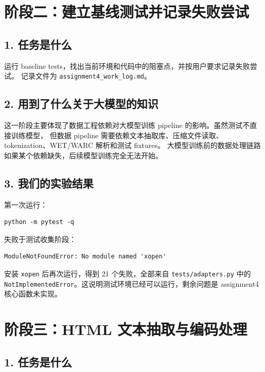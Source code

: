 \documentclass[UTF8,11pt]{ctexart}
\begin{document}
\section{阶段二：建立基线测试并记录失败尝试}

\subsection*{1. 任务是什么}

运行 baseline tests，找出当前环境和代码中的阻塞点，并按用户要求记录失败尝试。
记录文件为 \texttt{assignment4\_work\_log.md}。

\subsection*{2. 用到了什么关于大模型的知识}

这一阶段主要体现了数据工程依赖对大模型训练 pipeline 的影响。虽然测试不直接训练模型，
但数据 pipeline 需要依赖文本抽取库、压缩文件读取、tokenization、WET/WARC 解析和测试 fixtures。
大模型训练前的数据处理链路如果某个依赖缺失，后续模型训练完全无法开始。

\subsection*{3. 我们的实验结果}

第一次运行：

\begin{lstlisting}
python -m pytest -q
\end{lstlisting}

失败于测试收集阶段：

\begin{lstlisting}
ModuleNotFoundError: No module named 'xopen'
\end{lstlisting}

安装 \texttt{xopen} 后再次运行，得到 21 个失败，全部来自 \texttt{tests/adapters.py} 中的
\texttt{NotImplementedError}。这说明测试环境已经可以运行，剩余问题是 assignment4 核心函数未实现。

\section{阶段三：HTML 文本抽取与编码处理}

\subsection*{1. 任务是什么}
\end{document}
